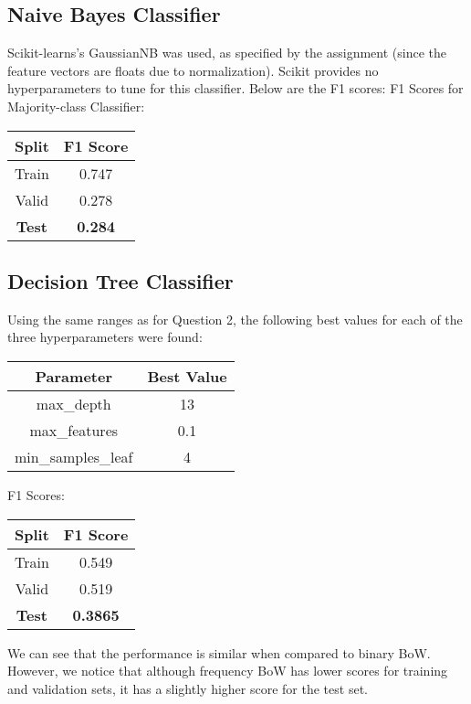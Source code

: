 \documentclass{article}
\begin{document}
\subsection{Naive Bayes Classifier}
Scikit-learns's GaussianNB was used, as specified by the assignment (since the feature vectors are floats due to normalization). Scikit provides no hyperparameters to tune for this classifier. Below are the F1 scores:
F1 Scores for Majority-class Classifier:
\begin{center}
\begin{tabular}{ |c|c| } 
	\hline
	\textbf{Split} & \textbf{F1 Score} \\ 
	\hline
	Train & 0.747 \\
	Valid & 0.278 \\ 
	\textbf{Test} & \textbf{0.284} \\
	\hline
\end{tabular}
\end{center}

\subsection{Decision Tree Classifier}
Using the same ranges as for Question 2, the following best values for each of the three hyperparameters were found:
\begin{center}
\begin{tabular}{ |c|c| } 
	\hline
	\textbf{Parameter} & \textbf{Best Value} \\ 
	\hline
	max\_depth & 13 \\
	max\_features & 0.1 \\ 
    min\_samples\_leaf & 4 \\
	\hline
\end{tabular}
\end{center}

F1 Scores:
\begin{center}
\begin{tabular}{ |c|c| } 
	\hline
	\textbf{Split} & \textbf{F1 Score} \\ 
	\hline
	Train & 0.549 \\
	Valid & 0.519 \\ 
	\textbf{Test} & \textbf{0.3865} \\
	\hline
\end{tabular}
\end{center}

We can see that the performance is similar when compared to binary BoW. However, we notice that although frequency BoW has lower scores for training and validation sets, it has a slightly higher score for the test set. 
\end{document}
